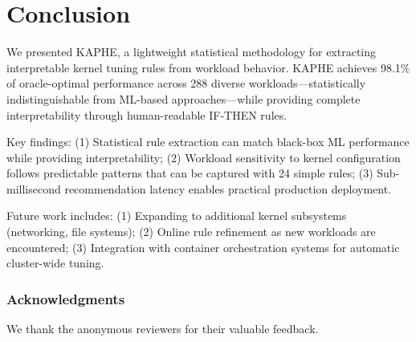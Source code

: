 \documentclass[11pt,a4paper]{article}
\begin{document}
\section{Conclusion}
\label{sec:conclusion}

We presented KAPHE, a lightweight statistical methodology for extracting interpretable kernel tuning rules from workload behavior. KAPHE achieves 98.1\% of oracle-optimal performance across 288 diverse workloads---statistically indistinguishable from ML-based approaches---while providing complete interpretability through human-readable IF-THEN rules.

Key findings: (1) Statistical rule extraction can match black-box ML performance while providing interpretability; (2) Workload sensitivity to kernel configuration follows predictable patterns that can be captured with 24 simple rules; (3) Sub-millisecond recommendation latency enables practical production deployment.

Future work includes: (1) Expanding to additional kernel subsystems (networking, file systems); (2) Online rule refinement as new workloads are encountered; (3) Integration with container orchestration systems for automatic cluster-wide tuning.

\subsubsection*{Acknowledgments}
We thank the anonymous reviewers for their valuable feedback.



\end{document}
